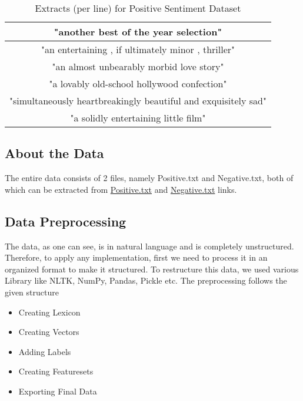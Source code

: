 \begin{table}[htb]
\centering
\begin{tabular}{|c|}
\hline

"another best of the year selection"\\
\hline

"an entertaining , if ultimately minor , thriller"\\
\hline

"an almost unbearably morbid love story"\\
\hline

"a lovably old-school hollywood confection"\\
\hline

"simultaneously heartbreakingly beautiful and exquisitely sad"\\
\hline

"a solidly entertaining little film"\\
\hline

\end{tabular}
\caption{Extracts (per line) for Positive Sentiment Dataset}
\label{tab:}
\end{table}


\subsection{About the Data}
The entire data consists of 2 files, namely Positive.txt and Negative.txt, both of which can be extracted from \href{https://pythonprogramming.net/static/downloads/machine-learning-data/pos.txt}{Positive.txt} and \href{https://pythonprogramming.net/static/downloads/machine-learning-data/neg.txt}{Negative.txt} links.

\subsection{Data Preprocessing}
The data, as one can see, is in natural language and is completely unstructured. Therefore, to apply any implementation, first we need to process it in an organized format to make it structured.
To restructure this data, we used various Library like NLTK, NumPy, Pandas, Pickle etc. The preprocessing follows the given structure
\begin{itemize}
  \item Creating Lexicon
  \item Creating Vectors
  \item Adding Labels
  \item Creating Featuresets
  \item Exporting Final Data
\end{itemize}

